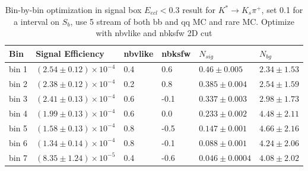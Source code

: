 \begin{table}[h]
\small
\begin{center}
\begin{tabular}{ |p{0.8cm}||p{3.7cm}||p{1.2cm}||p{1.2cm}||p{2.6cm}||p{2.7cm}| }
 \hline
 Bin & Signal Efficiency & nbvlike & nbksfw & $N_{sig}$ & $N_{bg}$  \\
 \hline
 bin 1  & $(2.54 \pm 0.12) \times 10^{-4}$ &0.4&0.6&$0.46\pm 0.005 $  &$2.34\pm 1.53 $\\ %
 \hline
 bin 2  & $(2.38 \pm 0.12)\times 10^{-4}$ &0.2& 0.8&$0.385 \pm 0.004 $&$2.54\pm 1.59 $\\ %
 \hline
 bin 3  & $(2.41 \pm 0.13)\times 10^{-4}$ &0.6&-0.1&$0.337 \pm 0.003 $&$2.98\pm 1.73 $\\ %
 \hline
 bin 4  & $(1.99 \pm 0.13)\times 10^{-4}$ &0.6&0.0&$0.233 \pm 0.002 $&$4.48\pm 2.11 $ \\ %
 \hline
 bin 5  & $(1.58\pm 0.13) \times 10^{-4}$ &0.8& -0.5&$0.147 \pm 0.001 $&$4.66\pm 2.16 $ \\ %
 \hline
 bin 6  & $(1.34\pm 0.14) \times 10^{-4}$ &0.8& -0.1&$0.088\pm 0.001 $&$4.24 \pm 2.06 $\\ %
 \hline
 bin 7  & $(8.35 \pm 1.24)\times 10^{-5}$ &0.4&-0.6&$0.046 \pm 0.0004 $&$ 4.08\pm 2.02 $ \\ %
 \hline
 \hline
\end{tabular}

\caption{Bin-by-bin optimization in signal box $E_{ecl} < 0.3$ result for $K^* \rightarrow K_s \pi^+$, set 0.1 for a interval on $S_b$, use 5 stream of both bb and qq MC and rare MC. Optimize with nbvlike and nbksfw 2D cut } \label{t:optkspi}
\end{center}
\end{table}

